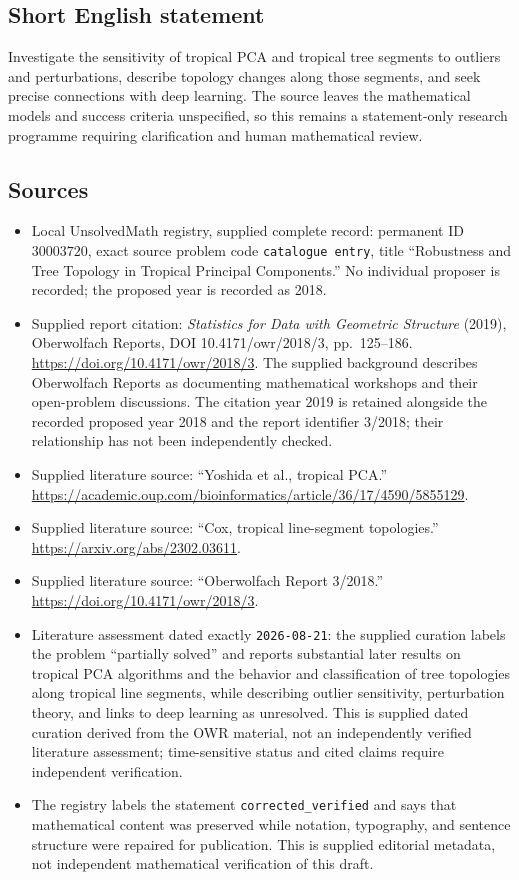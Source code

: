 \documentclass[11pt]{article}
\begin{document}
\subsection{Short English statement}
Investigate the sensitivity of tropical PCA and tropical tree segments to outliers and perturbations, describe topology changes along those segments, and seek precise connections with deep learning. The source leaves the mathematical models and success criteria unspecified, so this remains a statement-only research programme requiring clarification and human mathematical review.
\subsection{Sources}
\begin{itemize}
\item Local UnsolvedMath registry, supplied complete record: permanent ID \(30003720\), exact source problem code \texttt{catalogue entry}, title ``Robustness and Tree Topology in Tropical Principal Components.'' No individual proposer is recorded; the proposed year is recorded as 2018.
\item Supplied report citation: \emph{Statistics for Data with Geometric Structure} (2019), Oberwolfach Reports, DOI 10.4171/owr/2018/3, pp.~125--186. \url{https://doi.org/10.4171/owr/2018/3}. The supplied background describes Oberwolfach Reports as documenting mathematical workshops and their open-problem discussions. The citation year 2019 is retained alongside the recorded proposed year 2018 and the report identifier 3/2018; their relationship has not been independently checked.
\item Supplied literature source: ``Yoshida et al., tropical PCA.'' \url{https://academic.oup.com/bioinformatics/article/36/17/4590/5855129}.
\item Supplied literature source: ``Cox, tropical line-segment topologies.'' \url{https://arxiv.org/abs/2302.03611}.
\item Supplied literature source: ``Oberwolfach Report 3/2018.'' \url{https://doi.org/10.4171/owr/2018/3}.
\item Literature assessment dated exactly \texttt{2026-08-21}: the supplied curation labels the problem ``partially solved'' and reports substantial later results on tropical PCA algorithms and the behavior and classification of tree topologies along tropical line segments, while describing outlier sensitivity, perturbation theory, and links to deep learning as unresolved. This is supplied dated curation derived from the OWR material, not an independently verified literature assessment; time-sensitive status and cited claims require independent verification.
\item The registry labels the statement \texttt{corrected\_verified} and says that mathematical content was preserved while notation, typography, and sentence structure were repaired for publication. This is supplied editorial metadata, not independent mathematical verification of this draft.
\end{itemize}
\end{document}
